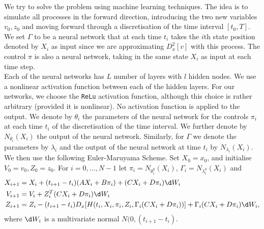 
We try to solve the problem using machine learning techniques. The idea is to simulate all processes in the forward direction, introducing the two new variables $v_0, z_0$ and moving forward through a discretisation of the time interval $[t_0, T]$. We set $\Gamma$ to be a neural network that at each time $t_i$ takes the $i$th state position denoted by $X_i$ as input since we are approximating $D_x^2[v]$ with this process. The control $\pi$ is also a neural network, taking in the same state $X_i$ as input at each time step.\\

Each of the neural networks has $L$ number of layers with $l$ hidden nodes. We use a nonlinear activation function between each of the hidden layers. For our networks, we choose the \verb|ReLu| activation function, although this choice is rather arbitrary (provided it is nonlinear). No activation function is applied to the output. We denote by $\theta_i$ the parameters of the neural network for the controls $\pi_i$ at each time $t_i$ of the discretisation of the time interval. We further denote by $N_{\theta_i}(X_i)$ the output of the neural network. Similarly, for $\Gamma$ we denote the parameters by $\lambda_i$ and the output of the neural network at time $t_i$ by $N_{\lambda_i}(X_i)$. \\

We then use the following Euler-Maruyama Scheme. Set $X_0 = x_0$, and initialise $V_0 = v_0, Z_0 = z_0$. For $i=0, \dots, N-1$ let $\pi_i = N_{\theta_i^0}(X_i)$, $\Gamma_i = N_{\lambda_i^0}(X_i)$ and 
\begin{align*}
    X_{i+1} &= X_i + (t_{i+1} - t_i) (AX_i + B\pi_i) + (CX_i + D \pi_i) \d W_i\\
    V_{i+1} &= V_i + Z^T_i (CX_i + D \pi_i) \d W_i \\
    Z_{i+1} &= Z_i - (t_{i+1} - t_i) D_x[H(t_i, X_i, \pi_i, Z_i, \Gamma_i(CX_i + D\pi_i))] + \Gamma_i (CX_i + D \pi_i) \d W_i,
\end{align*}
where $\d W_i$ is a multivariate normal $N(0, (t_{i+1} - t_i)$. \\

